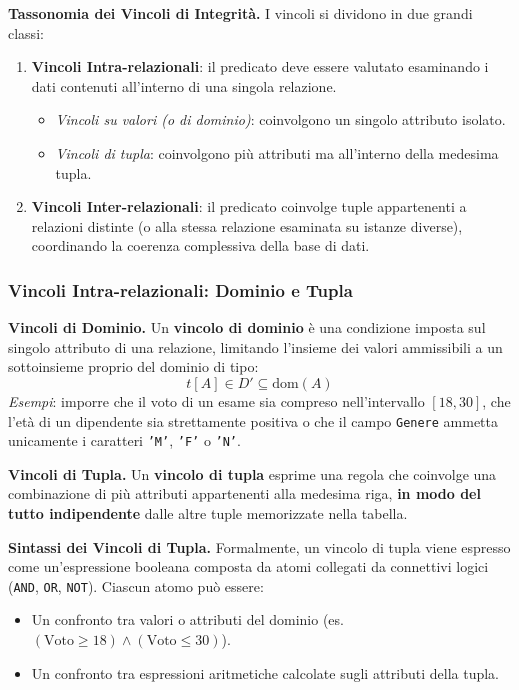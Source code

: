 \documentclass[12pt]{extarticle}
\begin{document}
\medskip
\noindent \textbf{Tassonomia dei Vincoli di Integrità.} I vincoli si dividono in due grandi classi:
\begin{enumerate}
    \item \textbf{Vincoli Intra-relazionali}: il predicato deve essere valutato esaminando i dati contenuti all'interno di una singola relazione.
    \begin{itemize}
        \item \textit{Vincoli su valori (o di dominio)}: coinvolgono un singolo attributo isolato.
        \item \textit{Vincoli di tupla}: coinvolgono più attributi ma all'interno della medesima tupla.
    \end{itemize}
    \item \textbf{Vincoli Inter-relazionali}: il predicato coinvolge tuple appartenenti a relazioni distinte (o alla stessa relazione esaminata su istanze diverse), coordinando la coerenza complessiva della base di dati.
\end{enumerate}

\subsubsection{Vincoli Intra-relazionali: Dominio e Tupla}
\noindent \textbf{Vincoli di Dominio.} Un \textbf{vincolo di dominio} è una condizione imposta sul singolo attributo di una relazione, limitando l'insieme dei valori ammissibili a un sottoinsieme proprio del dominio di tipo:
$$t[A] \in D' \subseteq \text{dom}(A)$$
\textit{Esempi}: imporre che il voto di un esame sia compreso nell'intervallo $[18, 30]$, che l'età di un dipendente sia strettamente positiva o che il campo \texttt{Genere} ammetta unicamente i caratteri \texttt{'M'}, \texttt{'F'} o \texttt{'N'}.

\medskip
\noindent \textbf{Vincoli di Tupla.} Un \textbf{vincolo di tupla} esprime una regola che coinvolge una combinazione di più attributi appartenenti alla medesima riga, \textbf{in modo del tutto indipendente} dalle altre tuple memorizzate nella tabella.

\medskip
\noindent \textbf{Sintassi dei Vincoli di Tupla.} Formalmente, un vincolo di tupla viene espresso come un'espressione booleana composta da atomi collegati da connettivi logici (\texttt{AND}, \texttt{OR}, \texttt{NOT}). Ciascun atomo può essere:
\begin{itemize}
    \item Un confronto tra valori o attributi del dominio (es. $(\text{Voto} \ge 18) \land (\text{Voto} \le 30)$).
    \item Un confronto tra espressioni aritmetiche calcolate sugli attributi della tupla.
\end{itemize}
\end{document}
